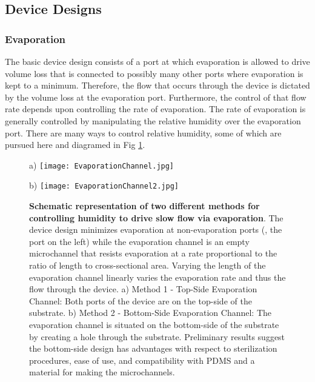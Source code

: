 \subsection{Device Designs}\label{sec:deviceDesign}
\subsubsection{Evaporation}\label{sec:deviceDesignEvap}
The basic device design consists of a port at which evaporation is allowed to drive volume loss that is connected to possibly many other ports where evaporation is kept to a minimum. Therefore, the flow that occurs through the device is dictated by the volume loss at the evaporation port. Furthermore, the control of that flow rate depends upon controlling the rate of evaporation. The rate of evaporation is generally controlled by manipulating the relative humidity over the evaporation port. There are many ways to control relative humidity, some of which are pursued here and diagramed in Fig \ref{fig:evaporationDevices}.

\begin{figure}[!ht]
\centering
a) \texttt{[image: EvaporationChannel.jpg]}


\vspace{0.5cm}


b) \texttt{[image: EvaporationChannel2.jpg]}
\caption{\textbf{Schematic representation of two different methods for controlling humidity to drive slow flow via evaporation}. The device design minimizes evaporation at non-evaporation ports (\ie , the port on the left) while the evaporation channel is an empty microchannel that resists evaporation at a rate proportional to the ratio of length to cross-sectional area. Varying the length of the evaporation channel linearly varies the evaporation rate and thus the flow through the device. a) Method 1 - Top-Side Evaporation Channel:  Both ports of the device are on the top-side of the substrate. b) Method 2 - Bottom-Side Evaporation Channel:  The evaporation channel is situated on the bottom-side of the substrate by creating a hole through the substrate. Preliminary results suggest the bottom-side design has advantages with respect to sterilization procedures, ease of use, and compatibility with PDMS and a material for making the microchannels.}
\label{fig:evaporationDevices}
\end{figure}

